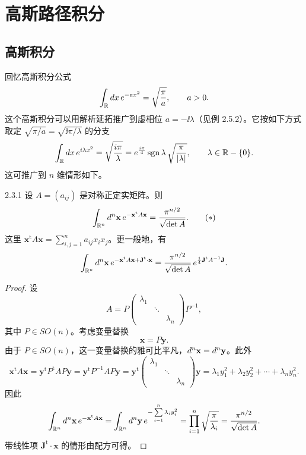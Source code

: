 \section{高斯路径积分}

\subsection{高斯积分}

回忆高斯积分公式
\[
\int_{\mathbb{R}}d x\,e^{-ax^2}=\sqrt{\frac{\pi}{a}},
\qquad a>0.
\]
这个高斯积分可以用解析延拓推广到虚相位 $a=-\ii\lambda$（见例 2.5.2）。它按如下方式取定 $\sqrt{\pi/a}=\sqrt{\ii\pi/\lambda}$ 的分支
\[
\int_{\mathbb{R}}d x\,e^{i\lambda x^2}
=\sqrt{\frac{i\pi}{\lambda}}
=e^{\frac{i\pi}{4}}\operatorname{sgn}\lambda\,\sqrt{\frac{\pi}{|\lambda|}},
\qquad \lambda\in\mathbb{R}-\{0\}.
\]
这可推广到 $n$ 维情形如下。

\begin{proposition}{2.3.1}
设 $A=(a_{ij})$ 是对称正定实矩阵。则
\[
\int_{\mathbb{R}^n}d^n\mathbf{x}\,e^{-\mathbf{x}^{\mathrm{t}}A\mathbf{x}}
=\frac{\pi^{n/2}}{\sqrt{\det A}}.
\tag{$*$}
\]
这里 $\mathbf{x}^{\mathrm{t}}A\mathbf{x}=\sum\limits_{i,j=1}^n a_{ij}x_ix_j$。更一般地，有
\[
\int_{\mathbb{R}^n}d^n\mathbf{x}\,
e^{-\mathbf{x}^{\mathrm{t}}A\mathbf{x}+\mathbf{J}^{\mathrm{t}}\cdot\mathbf{x}}
=\frac{\pi^{n/2}}{\sqrt{\det A}}\,
e^{\frac14\mathbf{J}^{\mathrm{t}}A^{-1}\mathbf{J}}.
\]
\end{proposition}

\begin{proof}
设
\[
A=P\begin{pmatrix}\lambda_1&&\\&\ddots&\\&&\lambda_n\end{pmatrix}P^{-1},
\]
其中 $P\in SO(n)$。考虑变量替换
\[
\mathbf{x}=P\mathbf{y}.
\]
由于 $P\in SO(n)$，这一变量替换的雅可比平凡，$d^n\mathbf{x}=d^n\mathbf{y}$。此外
\[
\mathbf{x}^{\mathrm{t}}A\mathbf{x}
=\mathbf{y}^{\mathrm{t}}P^{\mathrm{t}}AP\mathbf{y}
=\mathbf{y}^{\mathrm{t}}P^{-1}AP\mathbf{y}
=\mathbf{y}^{\mathrm{t}}\begin{pmatrix}\lambda_1&&\\&\ddots&\\&&\lambda_n\end{pmatrix}\mathbf{y}
=\lambda_1y_1^2+\lambda_2y_2^2+\cdots+\lambda_ny_n^2.
\]
因此
\[
\int_{\mathbb{R}^n}d^n\mathbf{x}\,e^{-\mathbf{x}^{\mathrm{t}}A\mathbf{x}}
=\int_{\mathbb{R}^n}d^n\mathbf{y}\,e^{-\sum\limits_{i=1}^n\lambda_iy_i^2}
=\prod_{i=1}^n\sqrt{\frac{\pi}{\lambda_i}}
=\frac{\pi^{n/2}}{\sqrt{\det A}}.
\]
带线性项 $\mathbf{J}^{\mathrm{t}}\cdot\mathbf{x}$ 的情形由配方可得。
\end{proof}

